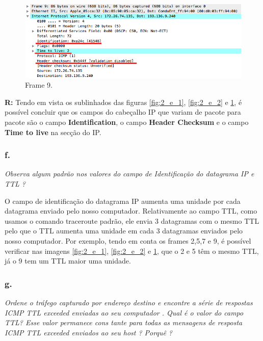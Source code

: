\documentclass{llncs}
\begin{document}
\begin{figure}[H]
\begin{center}
\includegraphics[scale=0.45]{2_e_3.png} 
\end{center}
\caption{\label{fig:2_e_3}Frame 9.}
\end{figure}

\textbf{R:} Tendo em vista os sublinhados das figuras \ref{fig:2_e_1}, \ref{fig:2_e_2} e \ref{fig:2_e_3}, é possível concluir que os campos do cabeçalho IP que variam de pacote para pacote são o campo \textbf{Identification}, o campo \textbf{Header Checksum} e o campo \textbf{Time to live} na secção do IP.

\subsubsection{f.}
\emph{Observa  algum 
padrão  nos  valores  do  campo  de  Identificação  do 
datagrama IP
e TTL
?}

O campo de identificação do datagrama IP aumenta uma unidade por cada datagrama enviado pelo nosso computador. Relativamente ao campo TTL, como usamos o comando traceroute padrão, ele envia 3 datagramas com o mesmo TTL pelo que o TTL aumenta uma unidade em cada 3 datagramas enviados pelo nosso computador. Por exemplo, tendo em conta os frames 2,5,7 e 9, é possível verificar nas imagens \ref{fig:2_e_1}, \ref{fig:2_e_2} e \ref{fig:2_e_3}, que o 2 e 5 têm o mesmo TTL, já o 9 tem um TTL maior uma unidade.

\subsubsection{g.}
\emph{Ordene o tráfego
capturado
por endereço 
destino
e
encontre a série de 
respostas  ICMP  TTL
exceeded
enviadas  ao  seu  computador
.  Qual  é  o 
valor  do  campo
TTL?
Esse
valor
permanece
cons
tante
para
todas  as 
mensagens  de  resposta
ICMP  TTL
exceeded
enviados  ao  seu 
host
? 
Porquê
?}
\end{document}
